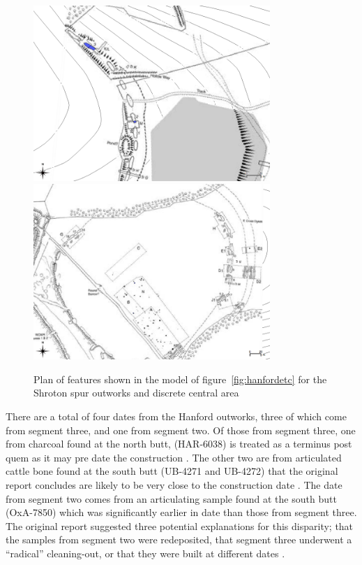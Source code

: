 \begin{figure}
\centering
	\includegraphics[width=0.8\textwidth]{figures/model6-plan1}
	\includegraphics[width=0.8\textwidth]{figures/model6-plan2}
  \caption{Plan of features shown in the model of figure~\ref{fig:hanfordetc} for the Shroton spur outworks and discrete central area}
  \label{fig:hanfordetc2}
\end{figure}

There are a total of four dates from the Hanford outworks, three of which come from segment three, and one from segment two. Of those from segment three, one from charcoal found at the north butt, (HAR-6038) is treated as a terminus post quem as it may pre date the construction \cite[396]{Mercer:2008fk}. The other two are from articulated cattle bone found at the south butt (UB-4271 and UB-4272) that the original report concludes are likely to be very close to the construction date  \cite[397]{Mercer:2008fk}. The date from segment two comes from an articulating sample found at the south butt (OxA-7850) which was significantly earlier in date than those from segment three. The original report suggested three potential explanations for this disparity; that the samples from segment two were redeposited, that segment three underwent a ``radical'' cleaning-out, or that they were built at different dates \cite[397]{Mercer:2008fk}.


